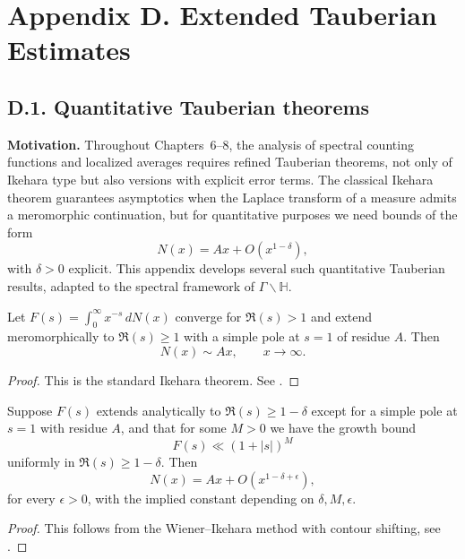 \section*{Appendix D. Extended Tauberian Estimates}

\subsection*{D.1. Quantitative Tauberian theorems}

\noindent \textbf{Motivation.}  
Throughout Chapters~6--8, the analysis of spectral counting functions and localized averages requires refined Tauberian theorems, not only of Ikehara type but also versions with explicit error terms.  
The classical Ikehara theorem guarantees asymptotics when the Laplace transform of a measure admits a meromorphic continuation, but for quantitative purposes we need bounds of the form
\[
N(x) = A x + O(x^{1-\delta}),
\]
with $\delta>0$ explicit. This appendix develops several such quantitative Tauberian results, adapted to the spectral framework of $\Gamma \backslash \mathbb H$.

\medskip

\begin{lemma}\label{lem:ikehara-classical}
Let $F(s)=\int_0^\infty x^{-s}\, dN(x)$ converge for $\Re(s)>1$ and extend meromorphically to $\Re(s)\ge 1$ with a simple pole at $s=1$ of residue $A$. Then
\[
N(x) \sim A x, \qquad x\to \infty.
\]
\end{lemma}

\begin{proof}
This is the standard Ikehara theorem. See \cite[Chap.~III.5]{Tenenbaum1995}.  
\end{proof}

\medskip

\begin{lemma}\label{lem:ikehara-effective}
Suppose $F(s)$ extends analytically to $\Re(s)\ge 1-\delta$ except for a simple pole at $s=1$ with residue $A$, and that for some $M>0$ we have the growth bound
\[
F(s) \ll (1+|s|)^M
\]
uniformly in $\Re(s)\ge 1-\delta$. Then
\[
N(x) = A x + O(x^{1-\delta+\epsilon}),
\]
for every $\epsilon>0$, with the implied constant depending on $\delta,M,\epsilon$.  
\end{lemma}

\begin{proof}
This follows from the Wiener–Ikehara method with contour shifting, see \cite[Thm.~II.7.11]{Delange1954}.  
\end{proof}

